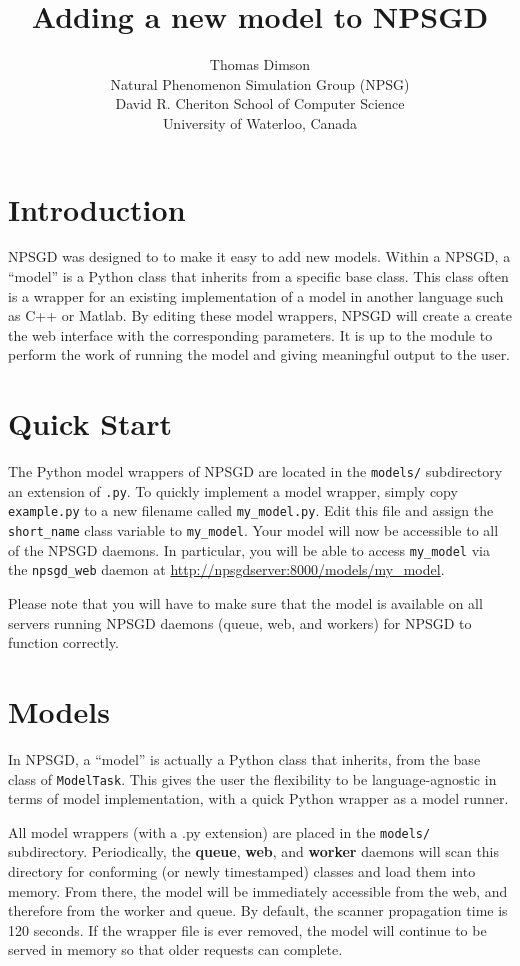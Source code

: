 \documentclass{article}
\title{Adding a new model to NPSGD}
\author{Thomas Dimson\\Natural Phenomenon Simulation Group (NPSG)\\David R. Cheriton School of Computer Science\\University of Waterloo, Canada}
\newcommand{\mpath}[1]{\texttt{#1}}
\newcommand{\mclass}[1]{\texttt{#1}}
\begin{document}
\maketitle
\tableofcontents
\newpage

\section{Introduction}
NPSGD was designed to to make it easy to add new models. Within a NPSGD, a
``model'' is a Python class that inherits from a specific
base class. This class often is a wrapper for an existing implementation of a
model in another language such as C++ or Matlab. By editing these model wrappers, NPSGD
will create a create the web interface with the corresponding parameters. It is up to the
module to perform the work of running the model and giving meaningful output to
the user.

\section{Quick Start}
The Python model wrappers of NPSGD are located in the \mpath{models/}
subdirectory an extension of \texttt{.py}. To quickly implement a model wrapper,
simply copy \mpath{example.py} to a
new filename called \mpath{my\_model.py}. Edit this file and assign the
\mpath{short\_name} class variable to \mpath{my\_model}. Your model will now be
accessible to all of the NPSGD daemons. In particular, you will be able to
access \texttt{my\_model} via the \texttt{npsgd\_web} daemon at 
\url{http://npsgdserver:8000/models/my_model}.

Please note that you will have to make sure that the model is available on all
servers running NPSGD daemons (queue, web, and workers) for NPSGD to function
correctly.

\section{Models}
In NPSGD, a ``model'' is actually a Python class that inherits, 
from the base class of \mclass{ModelTask}. This gives the user the
flexibility to be language-agnostic in terms of model implementation, with a
quick Python wrapper as a model runner.

All model wrappers (with a .py extension) are placed in the \mpath{models/} subdirectory.
Periodically, the \textbf{queue}, \textbf{web},
and \textbf{worker} daemons will scan this directory for conforming (or newly
timestamped) classes and load them into memory. From there, the model will be
immediately accessible from the web, and therefore from the worker and queue. By
default, the scanner propagation time is 120 seconds. If the wrapper file is
ever removed, the model will continue to be served in memory so that older
requests can complete.
\end{document}
